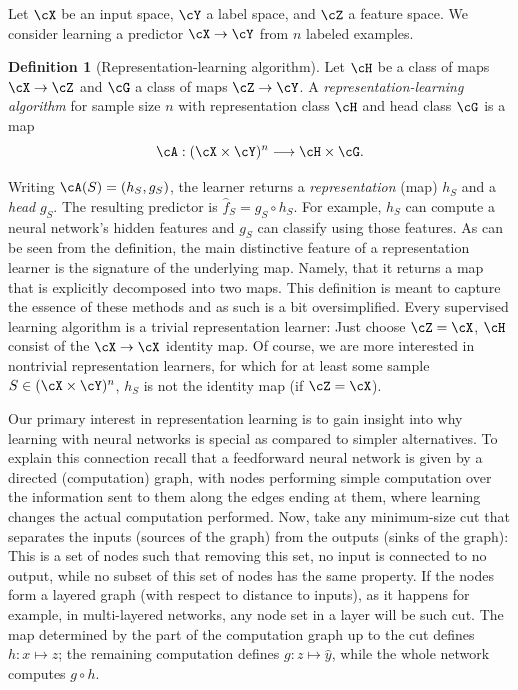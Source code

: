 \documentclass[11pt,twoside]{article}
\theoremstyle{definition}
\newtheorem{definition}[theorem]{Definition}
\theoremstyle{remark}
\begin{document}
Let $\cX$ be an input space, $\cY$ a label space, and $\cZ$ a feature space.
We consider learning a predictor $\cX\to\cY$ from $n$ labeled examples.

\begin{definition}[Representation-learning algorithm]
\label{def:representation-learning}
Let $\cH$ be a class of maps $\cX\to\cZ$ and $\cG$ a class of maps
$\cZ\to\cY$. A \emph{representation-learning algorithm}
for sample size $n$ with representation
class $\cH$ and head class $\cG$ is a map
\[
 \cA:(\cX\times\cY)^n\longrightarrow\cH\times\cG.
\]
\end{definition}


Writing $\cA(S)=(h_S,g_S)$, the learner returns a \emph{representation} (map)
$h_S$ and a \emph{head} $g_S$. The resulting predictor is
$\widehat f_S=g_S\circ h_S$. For example, $h_S$ can compute a neural
network's hidden features and $g_S$ can classify using those features.
As can be seen from the definition, the main distinctive feature of a representation
learner is the signature of the underlying map. Namely,
that it returns a map that is explicitly decomposed into two maps. This definition
is meant to capture the essence of these methods and as such is a bit oversimplified.
Every supervised learning algorithm is a trivial representation learner:
Just choose $\cZ = \cX$, $\cH$ consist of the $\cX \to \cX$ identity map.
Of course,
we are more interested in nontrivial representation learners, for which for at least
some sample $S\in (\cX\times \cY)^n$, $h_S$ is not the identity map (if $\cZ = \cX$).

Our primary interest in representation learning is to gain insight
into why learning with neural networks is special as compared to simpler alternatives.
To explain this connection recall that a feedforward neural network is
given by a directed (computation) graph, with nodes performing simple computation
over the information sent to them along the edges ending at them,
where learning changes the actual computation performed.
Now, take any minimum-size
cut that separates the inputs (sources of the graph) from the outputs (sinks of the graph):
This is a set of nodes such that removing this set, no input is connected to no output,
while no subset of this set of nodes has the same property.
If the nodes form a layered graph (with respect to distance to inputs), as
it happens for example, in multi-layered networks, any node set in a layer
will be such cut. The map determined by the part of the computation graph up to the cut
defines $h:x\mapsto z$; the remaining computation defines
$g:z\mapsto\widehat y$, while the whole network computes $g\circ h$.
\end{document}
